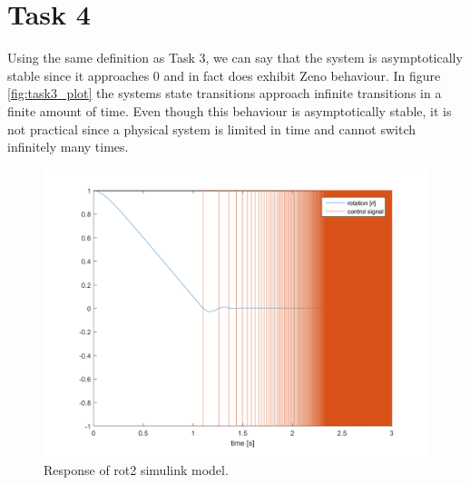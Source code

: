 \documentclass[a4paper,12pt,oneside,onecolumn]{article} %
\begin{document}
\section*{Task 4}
Using the same definition as Task 3, we can say that the system
is asymptotically stable since it approaches 0 and in fact does exhibit Zeno
behaviour. In figure \ref{fig:task3_plot} the systems state
transitions approach infinite transitions in a finite amount of time. 
Even though this behaviour is asymptotically stable, it is not practical since a
physical system is limited in time and cannot switch infinitely many times.
\begin{figure}[H]
    \centering
    \includegraphics[scale = 0.5]{../matlab/images/task4_plot.png}
    \caption{Response of rot2 simulink model.}
    \label{fig:task4_plot}
\end{figure}
\end{document}
